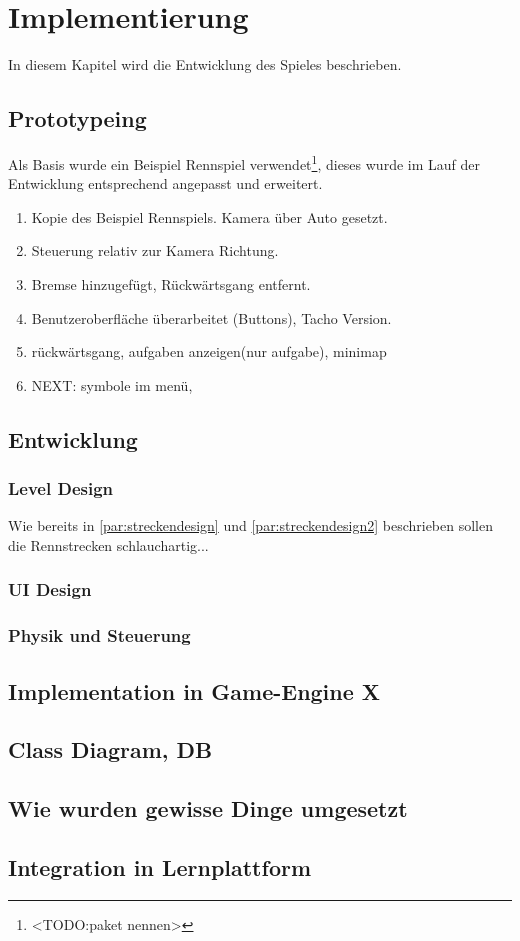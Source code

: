 \section{Implementierung}\label{sec:impl}
In diesem Kapitel wird die Entwicklung des Spieles beschrieben.
\subsection{Prototypeing}
	Als Basis wurde ein Beispiel Rennspiel verwendet\footnote{<TODO:paket nennen>}, dieses wurde im Lauf der Entwicklung entsprechend angepasst und erweitert.
	\begin{enumerate}[label=Prototyp \arabic*]
		\item{ Kopie des Beispiel Rennspiels. Kamera über Auto gesetzt. }
		\item{ Steuerung relativ zur Kamera Richtung. }
		\item{ Bremse hinzugefügt, Rückwärtsgang entfernt. }
		\item{ Benutzeroberfläche überarbeitet (Buttons), Tacho Version. }
		\item{ rückwärtsgang, aufgaben anzeigen(nur aufgabe), minimap }
		\item{NEXT: symbole im menü, }
	\end{enumerate}
\subsection{Entwicklung}
	\subsubsection{Level Design}
		Wie bereits in \ref{par:streckendesign} und \ref{par:streckendesign2} beschrieben sollen die Rennstrecken schlauchartig...
	\subsubsection{UI Design}
	\subsubsection{Physik und Steuerung}
	\subsubsection{}
\subsection{Implementation in Game-Engine X}
\subsection{Class Diagram, DB}
\subsection{Wie wurden gewisse Dinge umgesetzt}
\subsection{Integration in Lernplattform}
